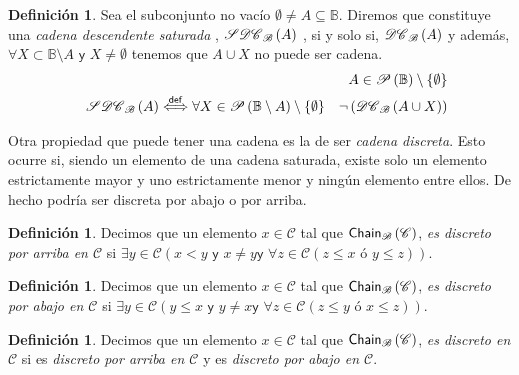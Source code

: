 \documentclass[final,12pt,a4paper,twoside,fleqn]{extbook}
\newcommand{\logicdef}{\ensuremath{
        \stackrel
            {\mathsf{def}}
            {\Longleftrightarrow}
}}
\newcommand{\setB}{\ensuremath{\mathbb{B}}}
\newcommand{\algB}{\ensuremath{\mathscr{B}}}
\theoremstyle{definition}
\newtheorem{defn}[thm]{Definición}
\theoremstyle{remark}
\begin{document}
\begin{defn}
Sea el subconjunto no vacío \(\emptyset \neq A \subseteq
\setB\). Diremos que constituye una \emph{ cadena descendente saturada },
\(\EsCadenaDescSat{\algB}{A}\) , si y solo si, \(\EsCadenaDesc{\algB}{A}\) y
además, \(\forall X \subset \setB\setminus A \textsf{ y } X\neq\emptyset\)
tenemos que \(A\cup{X}\) no puede ser cadena.
\begin{eqnarray}
\nonumber
&&A \in\PartesDeSinVacio{\setB}\\
&&\EsCadenaDescSat{\algB}{A} \logicdef \forall X \in
\PartesDeSinVacio{\setB\setminus{A}}
\quad\neg\left(\EsCadenaDesc{\algB}{A\cup{X}}\right)
\end{eqnarray}
\end{defn}



	Otra propiedad que puede tener una cadena es la de ser \emph{cadena
discreta}. Esto ocurre si, siendo un elemento de una cadena saturada, existe
solo un elemento estrictamente mayor y uno estrictamente menor y ningún
elemento entre ellos. De hecho podría ser discreta por abajo o por arriba.



\begin{defn}
	Decimos que un elemento \(x \in \mathscr{C}\) tal que \( \EsCadena
{\algB} {\mathscr{C}} \), \emph{es discreto por arriba  en \(\mathscr{C}\)}
si \( \exists y \in \mathscr{C} \left( x < y \textsf{ y } x \neq y  \textsf{
y } \forall z \in \mathscr{C} \left( z \leq x \textsf{ ó } y \leq z \right)
\right) \).
\end{defn}



\begin{defn}
	Decimos que un elemento \(x \in \mathscr{C}\) tal que \( \EsCadena
{\algB} {\mathscr{C}} \), \emph{es discreto por abajo en \(\mathscr{C}\)} si
\( \exists y \in \mathscr{C} \left( y \leq x \textsf{ y } y \neq x  \textsf{
y } \forall z \in \mathscr{C} \left( z \leq y \textsf{ ó } x \leq z \right)
\right) \).
\end{defn}



\begin{defn}
	Decimos que un elemento \(x \in \mathscr{C}\) tal que \( \EsCadena
{\algB} {\mathscr{C}} \), \emph{es discreto en \(\mathscr{C}\)} si es \emph{
discreto por arriba en \(\mathscr{C}\)} y es \emph{ discreto por abajo en
\(\mathscr{C}\)}.
\end{defn}
\end{document}
